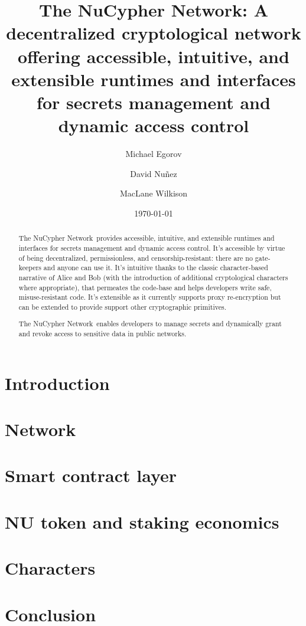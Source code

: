 \documentclass[longbibliography,nofootinbib,twocolumn]{revtex4-1}
\newcommand{\network}{The NuCypher Network}
\begin{document}
\title{\network: A decentralized cryptological network offering accessible, intuitive, and extensible runtimes and interfaces for secrets management and dynamic access control}

\author{Michael Egorov}
\author{David Nu{\~n}ez}
\author{MacLane Wilkison}

\begin{abstract}
    \network~provides accessible, intuitive, and extensible runtimes and interfaces for secrets management and dynamic access control.
    It's accessible by virtue of being decentralized, permissionless, and censorship-resistant: there are no gate-keepers and anyone can use it.
    It's intuitive thanks to the classic character-based narrative of Alice and Bob (with the introduction of additional cryptological characters
    where appropriate), that permeates the code-base and helps developers write safe, misuse-resistant code.
    It's extensible as it currently supports proxy re-encryption but can be extended to provide support other cryptographic primitives.

    \network~enables developers to manage secrets and dynamically grant and revoke access to sensitive data in public networks.
\end{abstract}

\date{\today}
\maketitle

\tableofcontents

\section{Introduction}

\section{Network}

\section{Smart contract layer}

\section{NU token and staking economics}

\section{Characters}

\section{Conclusion}


\end{document}
